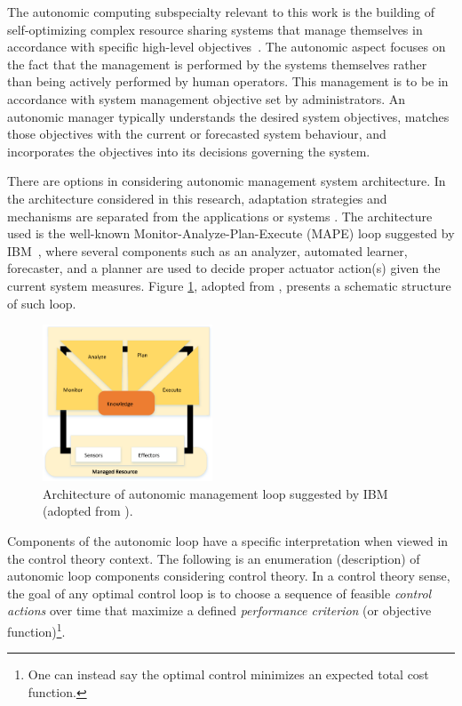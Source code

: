  The autonomic computing subspecialty relevant to this work is the building of self-optimizing complex resource sharing systems that manage themselves in accordance with specific high-level objectives~\cite{kephart_vision_2003}. The autonomic aspect focuses on the fact that the management is performed by the systems themselves rather than being actively performed by human operators. This management is to be in accordance with system management objective set by administrators. An autonomic manager typically understands the desired system objectives, matches those objectives with the current or forecasted system behaviour, and incorporates the objectives into its decisions governing the system. 

  There are options in considering autonomic management system architecture.
 In the architecture considered in this research, adaptation strategies and mechanisms are separated from the applications or systems \cite{garlan2004rainbow, tesauro_utility_2004}. 
The architecture used is the well-known Monitor-Analyze-Plan-Execute (MAPE)  loop suggested by IBM~\cite{computing2005architectural}, where several components such as an analyzer, automated learner, forecaster, and a planner are used to decide proper actuator action(s) given the current system measures. Figure \ref{fig:mapeloop}, adopted from \cite{mape-loop-pic}, presents a schematic structure of such loop.
\begin{figure}[h]
	\centering		
	\includegraphics[width=0.45\textwidth]{image/mapeloop1.eps} 
	\caption[Architecture of autonomic management loop.]{Architecture of autonomic management loop suggested by IBM (adopted from \cite{mape-loop-pic}).} 
	\label{fig:mapeloop}
\end{figure}
  
 Components of the autonomic loop have a specific interpretation when viewed in the control theory context. 
 The following is an enumeration (description) of autonomic loop components  considering control theory.
 In a control theory sense, the goal of any optimal control loop is to choose a sequence of feasible \textit{control actions} over time that maximize a defined \textit{performance criterion} (or objective function)\footnote{One can instead say the optimal control minimizes an expected total cost function.}.



